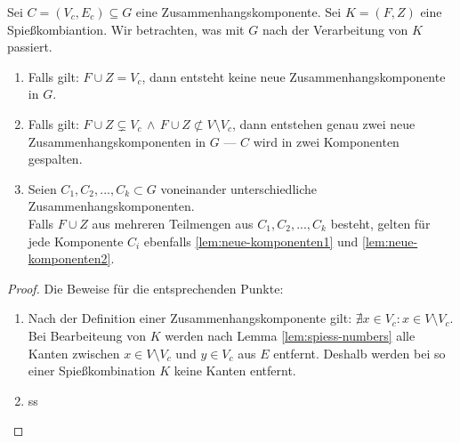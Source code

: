 \begin{lemma}\label{lem:neune-komponenten}
Sei $C = (V_c, E_c) \subseteq G$ eine Zusammenhangskomponente.
Sei $K = (F, Z)$ eine Spießkombiantion.
Wir betrachten, was mit $G$ nach der Verarbeitung von $K$ passiert.

\begin{enumerate}[label={\upshape(\roman*)}]
  \item Falls gilt: $F \cup Z = V_c$, dann entsteht keine neue Zusammenhangskomponente in $G$. \label{lem:neue-komponenten1}
  \item Falls gilt: $F \cup Z \subsetneq V_c\, \land\, F \cup Z \not\subset V \setminus V_c$, 
  dann entstehen genau zwei neue Zusammenhangskomponenten in $G$ --- $C$ wird in zwei Komponenten gespalten.\label{lem:neue-komponenten2}
  \item Seien $C_1, C_2, ..., C_k \subset G$ voneinander unterschiedliche Zusammenhangskomponenten.\\
  Falls $F \cup Z$ aus mehreren Teilmengen aus $C_1, C_2, ..., C_k$ besteht, gelten für jede Komponente $C_i$ ebenfalls \ref{lem:neue-komponenten1} und \ref{lem:neue-komponenten2}.
\end{enumerate}

\end{lemma}

\begin{proof}
Die Beweise für die entsprechenden Punkte:
\begin{enumerate}[label={\upshape(\roman*)}]
  \item Nach der Definition einer Zusammenhangskomponente gilt: $\nexists x \in V_c: x \in V \setminus V_c$.
  Bei Bearbeiteung von $K$ werden nach Lemma \ref{lem:spiess-numbers} alle Kanten zwischen 
  $x \in V \setminus V_c$ und $y \in V_c$ aus $E$ entfernt.
  Deshalb werden bei so einer Spießkombination $K$ keine Kanten entfernt.
  \item ss
\end{enumerate}
\end{proof}




